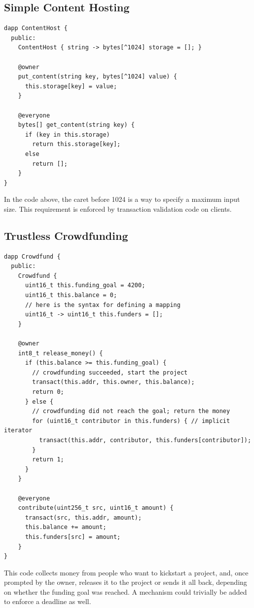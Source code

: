 \documentclass[letterpaper]{article}
\begin{document}
\subsection{Simple Content Hosting}
\begin{lstlisting}
dapp ContentHost {
  public:
    ContentHost { string -> bytes[^1024] storage = []; }
    
    @owner
    put_content(string key, bytes[^1024] value) {
      this.storage[key] = value;
    }
    
    @everyone
    bytes[] get_content(string key) {
      if (key in this.storage)
        return this.storage[key];
      else
        return [];
    }
}
\end{lstlisting}
In the code above, the caret before 1024 is a way to specify a maximum input size. This requirement is enforced by transaction validation code on clients.
\newline

\subsection{Trustless Crowdfunding}
\begin{lstlisting}
dapp Crowdfund {
  public:
    Crowdfund {
      uint16_t this.funding_goal = 4200;
      uint16_t this.balance = 0;
      // here is the syntax for defining a mapping
      uint16_t -> uint16_t this.funders = [];
    }
    
    @owner
    int8_t release_money() {
      if (this.balance >= this.funding_goal) {
        // crowdfunding succeeded, start the project
        transact(this.addr, this.owner, this.balance);
        return 0;
      } else {
        // crowdfunding did not reach the goal; return the money
        for (uint16_t contributor in this.funders) { // implicit iterator
          transact(this.addr, contributor, this.funders[contributor]);
        }
        return 1;
      }
    }
    
    @everyone
    contribute(uint256_t src, uint16_t amount) {
      transact(src, this.addr, amount);
      this.balance += amount;
      this.funders[src] = amount;
    }
}
\end{lstlisting}
This code collects money from people who want to kickstart a project, and, once prompted by the owner, releases it to the project or sends it all back, depending on whether the funding goal was reached. A mechanism could trivially be added to enforce a deadline as well.
\newline
\end{document}
